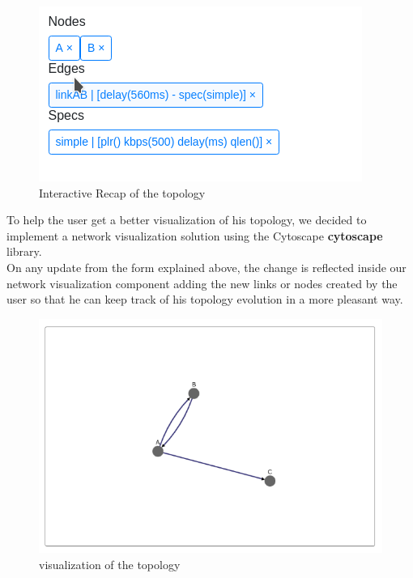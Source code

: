 \documentclass{eplmastersthesis}
\begin{document}
        \begin{figure}[H]
          \centering
          \includegraphics[scale=0.6]{figures/recap_topology.png}
          \caption{\label{recap_topology} Interactive Recap of the topology}
        \end{figure}

        To help the user get a better visualization of his topology, we
        decided to implement a network visualization solution using the
        Cytoscape \textbf{cytoscape} library.\\
        On any update from the form explained above, the change is reflected
        inside our network visualization component adding the new links or
        nodes created by the user so that he can keep track of his topology
        evolution in a more pleasant way.\\

        \begin{figure}[H]
          \centering
          \includegraphics[scale=0.6]{figures/visual_topology.png}
          \caption{\label{visual_topology} visualization of the topology}
        \end{figure}
\end{document}
